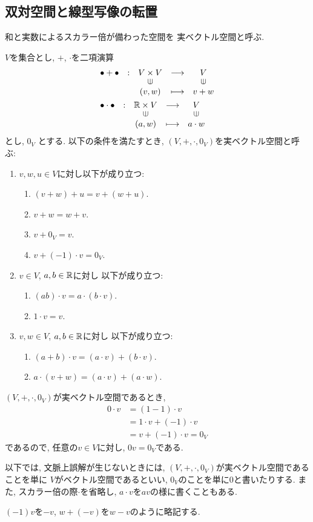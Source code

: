 \subsection{双対空間と線型写像の転置}
和と実数によるスカラー倍が備わった空間を
実ベクトル空間と呼ぶ.
\begin{definition}
  $V$を集合とし,
  $+$, $\cdot$を二項演算
  \begin{align*}
    &\shazo{\bullet + \bullet}
          {V\times V}{V}
          {(v,w)}{v+w}\\
    &\shazo{\bullet \cdot \bullet}
          {\RR\times V}{V}
          {(a,w)}{a\cdot w}
  \end{align*}
  とし,
  $0_V$
  とする.
  以下の条件を満たすとき,
  $(V,+,\cdot,0_V)$を実ベクトル空間と呼ぶ:
  \begin{enumerate}
  \item $v,w,u\in V$に対し以下が成り立つ:
    \begin{enumerate}
    \item $(v+w)+u=v+(w+u)$.
    \item $v+w=w+v$.
    \item $v+0_V=v$.
    \item $v+(-1)\cdot v=0_V$.
    \end{enumerate}
  \item $v\in V$, $a,b\in\mathbb{R}$に対し
    以下が成り立つ:
    \begin{enumerate}
    \item $(ab)\cdot v=a\cdot (b\cdot v)$.
    \item $1\cdot v=v$.
    \end{enumerate}      
  \item $v,w \in V$, $a,b\in\mathbb{R}$に対し
    以下が成り立つ:
    \begin{enumerate}
    \item $(a+b)\cdot v=(a\cdot v) + (b\cdot v)$.
    \item $a\cdot (v+w)=(a\cdot v) + (a\cdot w)$.
    \end{enumerate}      
  \end{enumerate}
\end{definition}
\begin{remark}
  $(V,+,\cdot,0_V)$が実ベクトル空間であるとき,
  \begin{align*}
    0\cdot v
    &=(1-1)\cdot v\\
    &=1\cdot v + (-1)\cdot v\\
    &=v+ (-1)\cdot v= 0_V
  \end{align*}
  であるので,
  任意の$v\in V$に対し, $0v=0_V$である.
\end{remark}
\begin{remark}
  以下では, 文脈上誤解が生じないときには,
  $(V,+,\cdot,0_V)$が実ベクトル空間であることを単に
  $V$がベクトル空間であるといい,
  $0_V$のことを単に$0$と書いたりする.
  また, スカラー倍の際$\cdot$を省略し, $a\cdot v$を$av$の様に書くこともある.
\end{remark}
\begin{remark}
  $(-1)v$を$-v$, $w+(-v)$を$w-v$のように略記する.
\end{remark}


